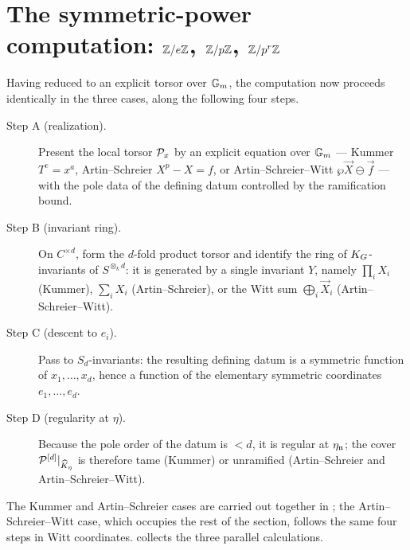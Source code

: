 \section{The symmetric-power computation: \texorpdfstring{$\mathbb{Z}/e\mathbb{Z}$, $\mathbb{Z}/p\mathbb{Z}$, $\mathbb{Z}/p^r\mathbb{Z}$}{Z/eZ, Z/pZ, Z/p^rZ}}
Having reduced to an explicit torsor over $\mathbb{G}_m$, the computation now proceeds
identically in the three cases, along the following four steps.
\begin{description}
  \item[Step A (realization).] Present the local torsor $\mathcal{P}_x$ by an explicit
  equation over $\mathbb{G}_m$ --- Kummer $T^e = x^a$, Artin--Schreier $X^p - X = f$, or
  Artin--Schreier--Witt $\wp \vec X \ominus \vec f$ --- with the pole data of the
  defining datum controlled by the ramification bound.
  \item[Step B (invariant ring).] On $C^{\times d}$, form the $d$-fold product
  torsor and identify the ring of $K_{G}$-invariants of $S^{\otimes_k d}$: it is
  generated by a single invariant $Y$, namely $\prod_i X_i$ (Kummer),
  $\sum_i X_i$ (Artin--Schreier), or the Witt sum $\bigoplus_i \vec X_i$
  (Artin--Schreier--Witt).
  \item[Step C (descent to $e_i$).] Pass to $S_d$-invariants: the resulting
  defining datum is a symmetric function of $x_1, \dots, x_d$, hence a function
  of the elementary symmetric coordinates $e_1, \dots, e_d$.
  \item[Step D (regularity at $\eta$).] Because the pole order of the datum is
  $< d$, it is regular at $\eta_{\mathfrak{n}}$; the cover $\mathcal{P}^{[d]}|_{\widehat K_\eta}$
  is therefore tame (Kummer) or unramified (Artin--Schreier and
  Artin--Schreier--Witt).
\end{description}
The Kummer and Artin--Schreier cases are carried out together in
; the Artin--Schreier--Witt
case, which occupies the rest of the section, follows the same four steps in
Witt coordinates.  collects the
three parallel calculations.

